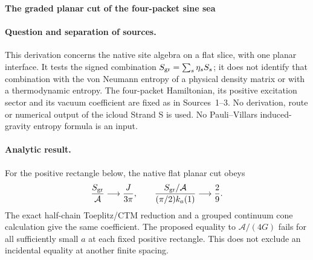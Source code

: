 \documentclass[10pt]{article}
\begin{document}
\begin{center}\textbf{The graded planar cut of the four-packet sine sea}\end{center}

\paragraph{Question and separation of sources.}
This derivation concerns the native site algebra on a flat slice,
with one planar interface. It tests the signed combination
$S_{\rm gr}=\sum_s\eta_s S_s$; it does not identify that combination
with the von Neumann entropy of a physical density matrix or with a
thermodynamic entropy. The four-packet Hamiltonian, its positive
excitation sector and its vacuum coefficient are fixed as in Sources~1--3.
No derivation, route or numerical output of the icloud Strand S is
used. No Pauli--Villars induced-gravity entropy formula is an input.

\paragraph{Analytic result.}
For the positive rectangle below, the native flat planar cut obeys
\begin{equation}
 \frac{S_{\rm gr}}{\mathcal A}
 \longrightarrow \frac{J}{3\pi},\qquad
 \frac{S_{\rm gr}/\mathcal A}{(\pi/2)k_a(1)}
 \longrightarrow \frac29 .
 \label{eq:s-claim}
\end{equation}
The exact half-chain Toeplitz/CTM reduction and a grouped continuum
cone calculation give the same coefficient. The proposed equality
to $\mathcal A/(4G)$ fails for all sufficiently small $a$ at each
fixed positive rectangle. This does not exclude an incidental
equality at another finite spacing.
\end{document}
